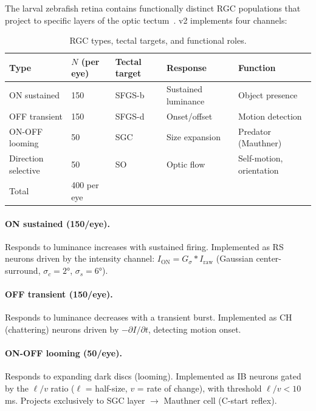 \documentclass[11pt,a4paper]{article}
\begin{document}
The larval zebrafish retina contains functionally distinct RGC populations
that project to specific layers of the optic tectum~\cite{robles2014,nikolaou2012}.
v2 implements four channels:

\begin{table}[H]
\centering
\caption{RGC types, tectal targets, and functional roles.}
\label{tab:rgc}
\begin{tabular}{llllp{3.5cm}}
\toprule
Type & $N$ (per eye) & Tectal target & Response & Function \\
\midrule
ON sustained     & 150 & SFGS-b & Sustained luminance & Object presence \\
OFF transient    & 150 & SFGS-d & Onset/offset        & Motion detection \\
ON-OFF looming   &  50 & SGC    & Size expansion      & Predator (Mauthner) \\
Direction selective & 50 & SO   & Optic flow          & Self-motion, orientation \\
\midrule
Total & 400 per eye & & & \\
\bottomrule
\end{tabular}
\end{table}

\paragraph{ON sustained (150/eye).}
Responds to luminance increases with sustained firing.
Implemented as RS neurons driven by the intensity channel:
$I_\text{ON} = G_\sigma * I_\text{raw}$ (Gaussian center-surround, $\sigma_c = 2°$, $\sigma_s = 6°$).

\paragraph{OFF transient (150/eye).}
Responds to luminance decreases with a transient burst.
Implemented as CH (chattering) neurons driven by $-\partial I/\partial t$,
detecting motion onset.

\paragraph{ON-OFF looming (50/eye).}
Responds to expanding dark discs (looming).
Implemented as IB neurons gated by the $\ell/v$ ratio
($\ell$ = half-size, $v$ = rate of change), with threshold $\ell/v < 10$\,ms.
Projects exclusively to SGC layer $\to$ Mauthner cell (C-start reflex).
\end{document}
